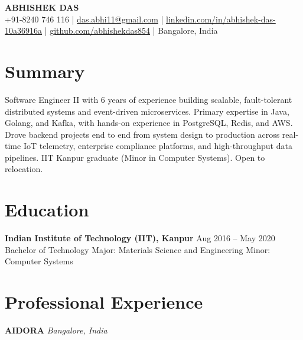 \documentclass[11pt,a4paper]{article}
\begin{document}
\begin{center}
    {\fontsize{22pt}{24pt}\selectfont\bfseries ABHISHEK DAS}\\[7pt]
    \small
    +91-8240 746 116 \quad|\quad
    \href{mailto:das.abhi11@gmail.com}{das.abhi11@gmail.com} \quad|\quad
    \href{https://www.linkedin.com/in/abhishek-das-10a36916a/}{linkedin.com/in/abhishek-das-10a36916a} \quad|\quad
    \href{https://github.com/abhishekdas854}{github.com/abhishekdas854} \quad|\quad
    Bangalore, India
\end{center}
\vspace{-4pt}

\section{Summary}
\noindent Software Engineer II with 6 years of experience building scalable, fault-tolerant distributed systems and event-driven microservices. Primary expertise in Java, Golang, and Kafka, with hands-on experience in PostgreSQL, Redis, and AWS. Drove backend projects end to end from system design to production across real-time IoT telemetry, enterprise compliance platforms, and high-throughput data pipelines. IIT Kanpur graduate (Minor in Computer Systems). Open to relocation.

\section{Education}
\textbf{Indian Institute of Technology (IIT), Kanpur} \hfill Aug 2016 -- May 2020 \\
Bachelor of Technology \textbar{} Major: Materials Science and Engineering \textbar{} Minor: Computer Systems

\vspace{4pt}

\section{Professional Experience}

{\Large\bfseries AIDORA} \hfill \textit{Bangalore, India}
\end{document}
